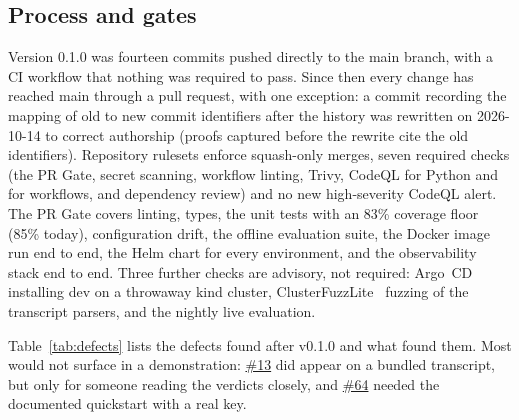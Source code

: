 \documentclass[11pt]{article}
\newcommand{\gh}[1]{\href{https://github.com/Organized-AI/podcast-agent/issues/#1}{\##1}}
\begin{document}
\subsection{Process and gates}
Version 0.1.0 was fourteen commits pushed directly to the main branch, with a CI workflow that nothing was required to pass. Since then every change has reached main through a pull request, with one exception: a commit recording the mapping of old to new commit identifiers after the history was rewritten on 2026-10-14 to correct authorship (proofs captured before the rewrite cite the old identifiers). Repository rulesets enforce squash-only merges, seven required checks (the PR Gate, secret scanning, workflow linting, Trivy, CodeQL for Python and for workflows, and dependency review) and no new high-severity CodeQL alert. The PR Gate covers linting, types, the unit tests with an 83\% coverage floor (85\% today), configuration drift, the offline evaluation suite, the Docker image run end to end, the Helm chart for every environment, and the observability stack end to end. Three further checks are advisory, not required: Argo~CD installing dev on a throwaway kind cluster, ClusterFuzzLite~\citep{clusterfuzzlite} fuzzing of the transcript parsers, and the nightly live evaluation.

Table~\ref{tab:defects} lists the defects found after v0.1.0 and what found them. Most would not surface in a demonstration: \gh{13} did appear on a bundled transcript, but only for someone reading the verdicts closely, and \gh{64} needed the documented quickstart with a real key.
\end{document}
